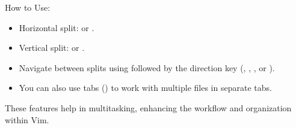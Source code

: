 \documentclass[titlepage]{article}
\begin{document}
\begin{enumerate}
How to Use:
\begin{itemize}
\item Horizontal split:  or .
\item Vertical split:  or .
\item Navigate between splits using  followed by the direction key (, , , or ).
\item You can also use tabs () to work with multiple files in separate tabs.
\end{itemize}
These features help in multitasking, enhancing the workflow and organization within Vim.
\end{enumerate}
\end{document}
